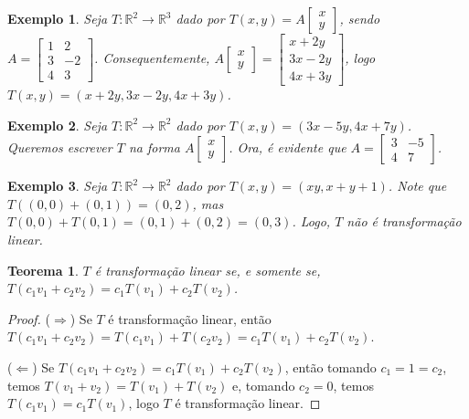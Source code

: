 \documentclass{article}
\newtheorem{theorem}{Teorema}[section]
\newtheorem*{example}{Exemplo}
\begin{document}
\begin{example}
	Seja $T:\mathbb{R}^2\to\mathbb{R}^3$ dado por $T(x,y) = A\begin{bmatrix}
	x\\
	y
	\end{bmatrix}$, sendo $A = \begin{bmatrix}
	1 & 2 \\
	3 & -2 \\
	4 & 3
	\end{bmatrix}$. Consequentemente, $A\begin{bmatrix}
	x\\
	y
	\end{bmatrix} = \begin{bmatrix}
	x + 2y \\
	3x - 2y \\
	4x + 3y
	\end{bmatrix}$, logo $T(x,y) = (x+2y, 3x - 2y, 4x + 3y)$.
\end{example}

\begin{example}
	Seja $T:\mathbb{R}^2\to\mathbb{R}^2$ dado por $T(x,y) = (3x - 5y, 4x + 7y)$. Queremos escrever $T$ na forma $A\begin{bmatrix}
	x\\
	y
	\end{bmatrix}$. Ora, é evidente que $A = \begin{bmatrix}
	3 & -5 \\
	4 & 7
	\end{bmatrix}$.
\end{example}

\begin{example}
	Seja $T:\mathbb{R}^2\to\mathbb{R}^2$ dado por $T(x,y) = (xy, x+y+1)$. Note que $T((0,0)+(0,1)) = (0,2)$, mas $T(0,0) + T(0,1) = (0,1) + (0,2) = (0,3)$. Logo, $T$ não é transformação linear.
\end{example}

\begin{theorem}
	$T$ é transformação linear se, e somente se, $T(c_1v_1 + c_2v_2) = c_1T(v_1) + c_2T(v_2)$.
\end{theorem}

\begin{proof}
	($\Rightarrow$) Se $T$ é transformação linear, então $T(c_1v_1 + c_2v_2) = T(c_1v_1) + T(c_2v_2) = c_1T(v_1) + c_2T(v_2)$.
	\par\vspace{0.3cm}\hspace{16pt}($\Leftarrow$) Se $T(c_1v_1 + c_2v_2) = c_1T(v_1) + c_2T(v_2)$, então tomando $c_1 = 1 = c_2$, temos $T(v_1+v_2) = T(v_1) + T(v_2)$ e, tomando $c_2=0$, temos $T(c_1v_1) = c_1T(v_1)$, logo $T$ é transformação linear.
\end{proof}
\end{document}
